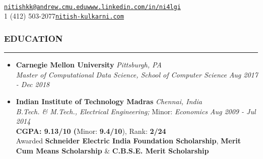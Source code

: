 \documentclass[10pt,a4paper,English]{article}
\newcommand\roottitle[1]{\vspace{-4mm}\subsubsection*{\uppercase{#1}}\vspace{-0.3em}\nopagebreak[4]\hrule\vspace{4mm}}
\newcommand\itemyear[1]{\hfill \emph{\color{itemyear} #1}}
\newcommand\itemenvnoindent{\setlength\itemsep{-1pt} \vspace{-1.5mm}}
\newcommand\hspacing{1mm}
\begin{document}
 \\
\vspace{-5mm}

\small

\noindent \href{mailto:nitishkk@andrew.cmu.edu}{\texttt{nitishkk\mbox{}@\mbox{}andrew.cmu.edu}}\hfill\href{https://www.linkedin.com/in/ni4lgi}{\texttt{www.linkedin.com/in/ni4lgi}}\\
\noindent \textsmaller{+}1 (412) 503-2077\hfill\href{http://www.nitish-kulkarni.com}{\texttt{nitish-kulkarni.com}}\\
\vspace{2mm}

\roottitle{Education}
    \begin{itemize}[leftmargin=11pt] \itemenvnoindent
    
    \item \textbf{Carnegie Mellon University} \itemyear{Pittsburgh, PA}\\[\hspacing]
        \textit{Master of Computational Data Science, School of Computer Science} \itemyear{Aug 2017 - Dec 2018} \\[\hspacing]

    \vspace{-3mm}

    \item \textbf{Indian Institute of Technology Madras}  \itemyear{Chennai, India}\\[\hspacing]
        \textit{B.Tech. \& M.Tech., Electrical Engineering;} Minor: \textit{Economics} \itemyear{Aug 2009 - Jul 2014}\\[\hspacing]
        \textbf{CGPA: 9.13/10 (}Minor: \textbf{9.4/10}), Rank: \textbf{2/24} \\[\hspacing]
        Awarded \textbf{Schneider Electric India Foundation Scholarship},
        \textbf{Merit Cum Means Scholarship} \& \textbf{C.B.S.E. Merit Scholarship}
    \end{itemize}
\end{document}

